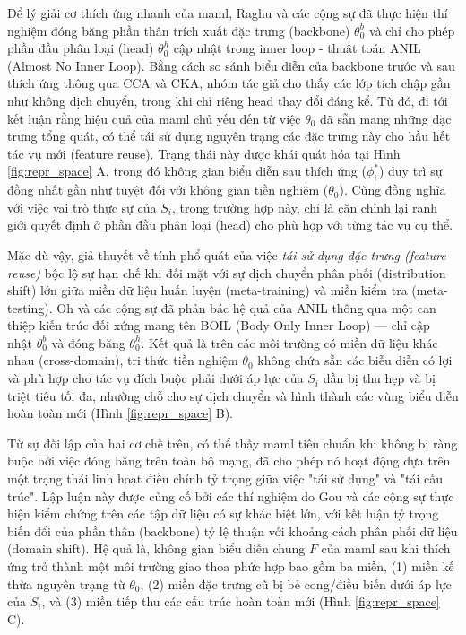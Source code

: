Để lý giải cơ thích ứng nhanh của \acrshort{maml}, Raghu và các cộng sự \cite{raghu2019rapid} đã thực hiện thí nghiệm đóng băng phần thân trích xuất đặc trưng (backbone) $\theta_0^{b}$ và chỉ cho phép phần đầu phân loại (head) $\theta_0^{h}$ cập nhật trong inner loop - thuật toán ANIL (Almost No Inner Loop). Bằng cách so sánh biểu diễn của backbone trước và sau thích ứng thông qua CCA và CKA, nhóm tác giả cho thấy các lớp tích chập gần như không dịch chuyển, trong khi chỉ riêng head thay đổi đáng kể. Từ đó, đi tới kết luận rằng hiệu quả của \acrshort{maml} chủ yếu đến từ việc $\theta_0$ đã sẵn mang những đặc trưng tổng quát, có thể tái sử dụng nguyên trạng các đặc trưng này cho hầu hết tác vụ mới (feature reuse). Trạng thái này được khái quát hóa tại Hình \ref{fig:repr_space} A, trong đó không gian biểu diễn sau thích ứng ($\phi_i^*$) duy trì sự đồng nhất gần như tuyệt đối với không gian tiền nghiệm ($\theta_0$). Cũng đồng nghĩa với việc vai trò thực sự của $S_i$, trong trường hợp này, chỉ là căn chỉnh lại ranh giới quyết định ở phần đầu phân loại (head) cho phù hợp với từng tác vụ cụ thể.

Mặc dù vậy, giả thuyết về tính phổ quát của việc \emph{tái sử dụng đặc trưng (feature reuse)} bộc lộ sự hạn chế khi đối mặt với sự dịch chuyển phân phối (distribution shift) lớn giữa miền dữ liệu huấn luyện (meta-training) và miền kiểm tra (meta-testing). Oh và các cộng sự \cite{oh2020boil} đã phản bác hệ quả của ANIL thông qua một can thiệp kiến trúc đối xứng mang tên BOIL (Body Only Inner Loop) — chỉ cập nhật $\theta_0^{b}$ và đóng băng $\theta_0^{h}$. Kết quả là trên các môi trường có miền dữ liệu khác nhau (cross-domain), tri thức tiền nghiệm $\theta_0$ không chứa sẵn các biễu diễn có lợi và phù hợp cho tác vụ đích buộc phải dưới áp lực của $S_i$ dần bị thu hẹp và bị triệt tiêu tối đa, nhường chỗ cho sự dịch chuyển và hình thành các vùng biểu diễn hoàn toàn mới (Hình \ref{fig:repr_space} B). 

Từ sự đối lập của hai cơ chế trên, có thể thấy \acrshort{maml} tiêu chuẩn khi không bị ràng buộc bởi việc đóng băng trên toàn bộ mạng, đã cho phép nó hoạt động dựa trên một trạng thái linh hoạt điều chỉnh tỷ trọng giữa việc "tái sử dụng" và "tái cấu trúc". Lập luận này được củng cố bởi các thí nghiệm do Gou và các cộng sự thực hiện kiểm chứng trên các tập dữ liệu có sự khác biệt lớn, với kết luận tỷ trọng biến đổi của phần thân (backbone) tỷ lệ thuận với khoảng cách phân phối dữ liệu (domain shift). Hệ quả là, không gian biểu diễn chung $F$ của \acrshort{maml} sau khi thích ứng trở thành một môi trường giao thoa phức hợp bao gồm ba miền, (1) miền kế thừa nguyên trạng từ $\theta_0$, (2) miền đặc trưng cũ bị bẻ cong/điều biến dưới áp lực của $S_i$, và (3) miền tiếp thu các cấu trúc hoàn toàn mới (Hình \ref{fig:repr_space} C).

